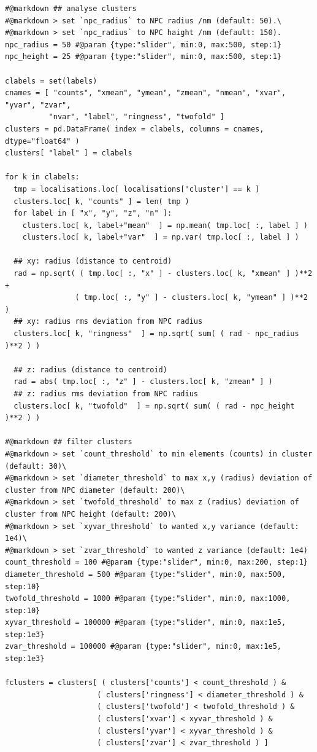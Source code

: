 \documentclass[11pt, a4paper, oneside, twocolumn]{report}
\begin{document}
\begin{verbatim}
#@markdown ## analyse clusters
#@markdown > set `npc_radius` to NPC radius /nm (default: 50).\
#@markdown > set `npc_radius` to NPC haight /nm (default: 150).
npc_radius = 50 #@param {type:"slider", min:0, max:500, step:1}
npc_height = 25 #@param {type:"slider", min:0, max:500, step:1}

clabels = set(labels)
cnames = [ "counts", "xmean", "ymean", "zmean", "nmean", "xvar", "yvar", "zvar",
          "nvar", "label", "ringness", "twofold" ]
clusters = pd.DataFrame( index = clabels, columns = cnames, dtype="float64" )
clusters[ "label" ] = clabels

for k in clabels:
  tmp = localisations.loc[ localisations['cluster'] == k ]
  clusters.loc[ k, "counts" ] = len( tmp )
  for label in [ "x", "y", "z", "n" ]:
    clusters.loc[ k, label+"mean"  ] = np.mean( tmp.loc[ :, label ] )
    clusters.loc[ k, label+"var"  ] = np.var( tmp.loc[ :, label ] )

  ## xy: radius (distance to centroid)
  rad = np.sqrt( ( tmp.loc[ :, "x" ] - clusters.loc[ k, "xmean" ] )**2 + 
                ( tmp.loc[ :, "y" ] - clusters.loc[ k, "ymean" ] )**2 )
  ## xy: radius rms deviation from NPC radius
  clusters.loc[ k, "ringness"  ] = np.sqrt( sum( ( rad - npc_radius )**2 ) )

  ## z: radius (distance to centroid)
  rad = abs( tmp.loc[ :, "z" ] - clusters.loc[ k, "zmean" ] )
  ## z: radius rms deviation from NPC radius
  clusters.loc[ k, "twofold"  ] = np.sqrt( sum( ( rad - npc_height )**2 ) )

#@markdown ## filter clusters
#@markdown > set `count_threshold` to min elements (counts) in cluster (default: 30)\
#@markdown > set `diameter_threshold` to max x,y (radius) deviation of cluster from NPC diameter (default: 200)\
#@markdown > set `twofold_threshold` to max z (radius) deviation of cluster from NPC height (default: 200)\
#@markdown > set `xyvar_threshold` to wanted x,y variance (default: 1e4)\
#@markdown > set `zvar_threshold` to wanted z variance (default: 1e4)
count_threshold = 100 #@param {type:"slider", min:0, max:200, step:1}
diameter_threshold = 500 #@param {type:"slider", min:0, max:500, step:10}
twofold_threshold = 1000 #@param {type:"slider", min:0, max:1000, step:10}
xyvar_threshold = 100000 #@param {type:"slider", min:0, max:1e5, step:1e3}
zvar_threshold = 100000 #@param {type:"slider", min:0, max:1e5, step:1e3}

fclusters = clusters[ ( clusters['counts'] < count_threshold ) &
                     ( clusters['ringness'] < diameter_threshold ) &
                     ( clusters['twofold'] < twofold_threshold ) &
                     ( clusters['xvar'] < xyvar_threshold ) & 
                     ( clusters['yvar'] < xyvar_threshold ) &
                     ( clusters['zvar'] < zvar_threshold ) ]
\end{verbatim}
           
\end{document}
